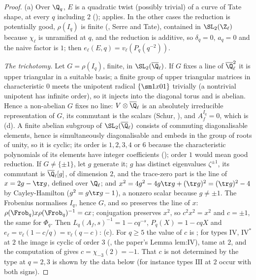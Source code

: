 \begin{proof}
(a) Over $\Q_q$, $E$ is a quadratic twist (possibly trivial) of a curve of Tate shape, at every $q$ including $2$ (); 
applies. In the other cases the reduction is potentially good, $\rho(I_q)$ is finite (, Serre and Tate), contained in $\SL_2(\Z_\ell)$ because $\chi_\ell$ is
unramified at $q$, and the reduction is additive, so $\delta_q=0$, $a_q=0$ and the naive factor is $1$; then $e_\ell(E,q)=v_\ell(P_q(q^{-2}))$.

\emph{The trichotomy.} Let $G=\rho(I_q)$, finite, in $\SL_2(\overline\Q_\ell)$. If $G$ fixes a line of $\overline\Q_\ell^2$ it is upper triangular in a suitable basis; a finite group of
upper triangular matrices in characteristic $0$ meets the unipotent radical $\{\sm1x01\}$ trivially (a nontrivial unipotent has infinite order), so it injects into the
diagonal torus and is abelian. Hence a non-abelian $G$ fixes no line: $V\otimes\overline\Q_\ell$ is an absolutely irreducible representation of $G$, its commutant is the scalars
(Schur, ), and $A_f^{I_q}=0$, which is (d). A finite abelian subgroup of $\SL_2(\overline\Q_\ell)$ consists of commuting diagonalisable elements, hence is simultaneously
diagonalisable and embeds in the group of roots of unity, so it is cyclic; its order is $1,2,3,4$ or $6$ because the characteristic polynomials of its elements have
integer coefficients \cite[Section 2]{SerreTate68} (); order $1$ would mean good reduction. If $G\ne\{\pm1\}$, let $g$ generate it; $g$ has distinct eigenvalues
$\zeta^{\pm1}$, its commutant is $\overline\Q_\ell[g]$, of dimension $2$, and the trace-zero part is the line of $x=2g-\tr g$, defined over $\Q_\ell$; and
$x^2=4g^2-4g\tr g+(\tr g)^2=(\tr g)^2-4$ by Cayley-Hamilton ($g^2=g\tr g-1$), a nonzero scalar because $g\ne\pm1$. The Frobenius normalises $I_q$, hence $G$, and so preserves the
line of $x$: $\rho(\Frob_q)x\rho(\Frob_q)^{-1}=cx$; conjugation preserves $x^2$, so $c^2x^2=x^2$ and $c=\pm1$, the same for $\Phi_q$. Then $L_q(A_f,s)^{-1}=1-cq^{-s}$,
$P_q(X)=1-cqX$ and $e_\ell=v_\ell(1-c/q)=v_\ell(q-c)$: (c). For $q\ge5$ the value of $c$ is ; for types $\mathrm{IV}$, $\mathrm{IV}^*$ at $2$ the image is cyclic of
order $3$ (, the paper's Lemma lem:IV), tame at $2$, and the computation of  gives $c=\chi_{-3}(2)=-1$. That $c$ is not determined by the
type at $q=2,3$ is shown by the data below (for instance types $\mathrm{III}$ at $2$ occur with both signs).


\end{proof}
